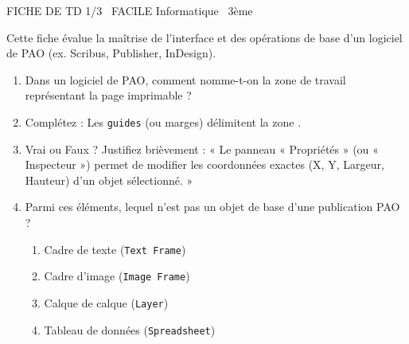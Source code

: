 \documentclass[11pt]{article}
\begin{document}
\begin{tcolorbox}[enhanced,colback=popink,colframe=popink,arc=10pt,boxrule=0pt,left=12pt,right=12pt,top=9pt,bottom=9pt]
{\color{white}\popxbold\small FICHE DE TD 1/3 \textbullet\ FACILE \hfill Informatique \textbullet\ 3ème\par}
\end{tcolorbox}
\vspace{4pt}
Cette fiche évalue la maîtrise de l'interface et des opérations de base d'un logiciel de PAO (ex. Scribus, Publisher, InDesign).

\begin{exercice}
\begin{enumerate}
    \item Dans un logiciel de PAO, comment nomme-t-on la zone de travail représentant la page imprimable ?
    \item Complétez : Les \texttt{guides} (ou marges) délimitent la zone \underline{\hspace{4cm}}.
    \item Vrai ou Faux ? Justifiez brièvement : « Le panneau « Propriétés » (ou « Inspecteur ») permet de modifier les coordonnées exactes (X, Y, Largeur, Hauteur) d'un objet sélectionné. »
    \item Parmi ces éléments, lequel n'est pas un objet de base d'une publication PAO ?
    \begin{enumerate}
        \item Cadre de texte (\texttt{Text Frame})
        \item Cadre d'image (\texttt{Image Frame})
        \item Calque de calque (\texttt{Layer})
        \item Tableau de données (\texttt{Spreadsheet})
    \end{enumerate}
\end{enumerate}
\end{exercice}
\end{document}
